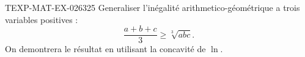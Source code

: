 \begin{exercice}{TEXP-MAT-EX-026}{3}{25}
Generaliser l'inégalité arithmetico-géométrique a trois variables positives :
\[ \frac{a+b+c}{3} \geq \sqrt[3]{abc}. \]
On demontrera le résultat en utilisant la concavité de $\ln$.

\end{exercice}
